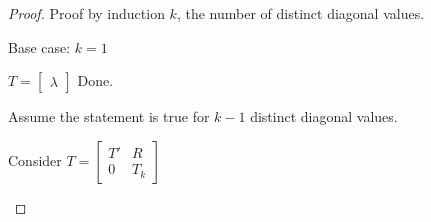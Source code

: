 \documentclass[letterpaper,12pt,fleqn]{article}
\renewcommand{\l}{\lambda}
\begin{document}
\begin{proof}
  Proof by induction $k$, the number of distinct diagonal values.
  \begin{description}
  \item Base case: $k=1$

    $T=\begin{bmatrix} \l \end{bmatrix}$
    Done.

  \item Assume the statement is true for $k-1$ distinct diagonal values.

  \item Consider $T=\left[\begin{array}{c|c}
    T' & R \\
    \hline
    0 & T_k
  \end{array}\right]$


\end{description}
\end{proof}
\end{document}
